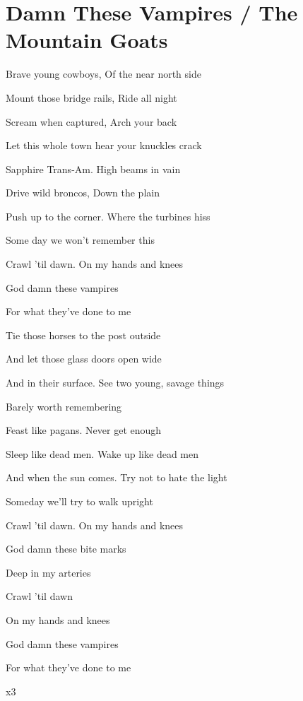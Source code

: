 \section{Damn These Vampires / The Mountain Goats}\label{sec:damnthesevampires}

\Amajor
\Gmajor
\FsharpMinor
\DmajorEasy
\EmajorEasy


Brave young cowboys, Of the near north side

Mount those bridge rails, Ride all night

Scream when captured, Arch your back

Let this whole town hear your knuckles crack

Sapphire Trans-Am. High beams in vain

Drive wild broncos, Down the plain

Push up to the corner. Where the turbines hiss

Some day we won't remember this

Crawl 'til dawn. On my hands and knees

God damn these vampires

For what they've done to me

Tie those horses to the post outside

And let those glass doors open wide 

And in their surface. See two young, savage things

Barely worth remembering

Feast like pagans. Never get enough

Sleep like dead men. Wake up like dead men

And when the sun comes. Try not to hate the light

Someday we'll try to walk upright

Crawl 'til dawn. On my hands and knees

God damn these bite marks

Deep in my arteries

Crawl 'til dawn
    
On my hands and knees

God damn these vampires

For what they've done to me

   x3

  
